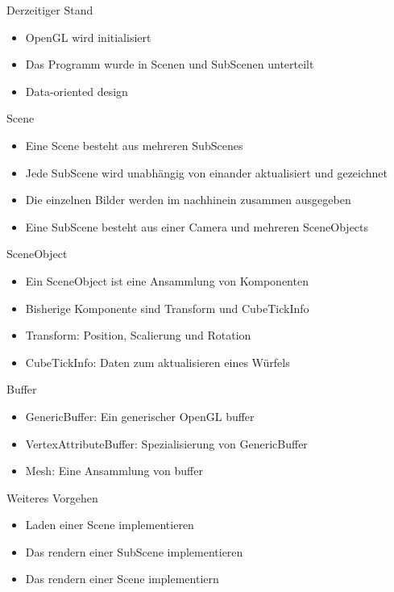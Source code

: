 \documentclass{../presentation}
\begin{document}
\frame[plain]{\titlepage}

\begin{frame}{Derzeitiger Stand}
    \begin{itemize}
        \item OpenGL wird initialisiert
        \item Das Programm wurde in Scenen und SubScenen unterteilt
        \item Data-oriented design
    \end{itemize}
\end{frame}

\begin{frame}{Scene}
    \begin{itemize}
        \item Eine Scene besteht aus mehreren SubScenes
        \item Jede SubScene wird unabhängig von einander aktualisiert und gezeichnet
        \item Die einzelnen Bilder werden im nachhinein zusammen ausgegeben
        \item Eine SubScene besteht aus einer Camera und mehreren SceneObjects
    \end{itemize}
\end{frame}

\begin{frame}{SceneObject}
    \begin{itemize}
        \item Ein SceneObject ist eine Ansammlung von Komponenten
        \item Bisherige Komponente sind Transform und CubeTickInfo
        \item Transform: Position, Scalierung und Rotation
        \item CubeTickInfo: Daten zum aktualisieren eines Würfels
    \end{itemize}
\end{frame}

\begin{frame}{Buffer}
    \begin{itemize}
        \item GenericBuffer: Ein generischer OpenGL buffer
        \item VertexAttributeBuffer: Spezialisierung von GenericBuffer
        \item Mesh: Eine Ansammlung von buffer   
    \end{itemize}
\end{frame}

\begin{frame}{Weiteres Vorgehen}
    \begin{itemize}
        \item Laden einer Scene implementieren
        \item Das rendern einer SubScene implementieren
        \item Das rendern einer Scene implementiern
    \end{itemize}
\end{frame}
\end{document}
